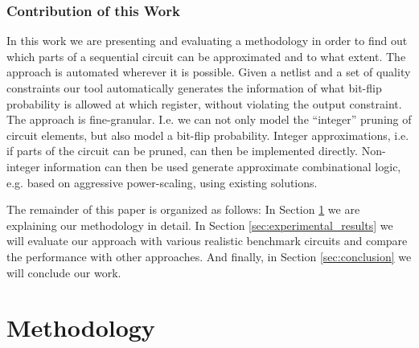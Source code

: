 \documentclass[conference]{IEEEtran}
\begin{document}
\subsubsection*{Contribution of this Work}
 In this work we are presenting and evaluating a methodology in order to find out which parts of a sequential circuit can be approximated and to what extent. The approach is automated wherever it is possible. Given a netlist and a set of quality constraints our tool automatically generates the information of what bit-flip probability is allowed at which register, without violating the output constraint. The approach is fine-granular. I.e. we can not only model the ``integer'' pruning of circuit elements, but also model a bit-flip probability. Integer approximations, i.e. if parts of the circuit can be pruned, can then be implemented directly. Non-integer information can then be used generate approximate combinational logic, e.g. based on aggressive power-scaling, using existing solutions.

The remainder of this paper is organized as follows: In Section \ref{sec:methodology} we are explaining our methodology in detail. In Section \ref{sec:experimental_results} we will evaluate our approach with various realistic benchmark circuits and compare the performance with other approaches. And finally, in Section \ref{sec:conclusion} we will conclude our work.





\section{Methodology}
\label{sec:methodology}
\end{document}
